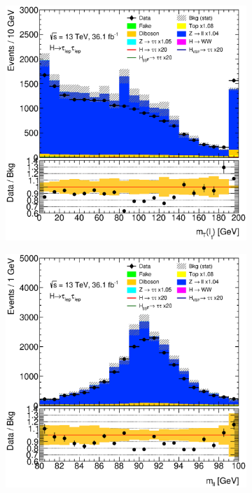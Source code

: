 \begin{figure}[htb]
\begin{subfigure}[t]{0.3\textwidth}
    \end{subfigure}
    \begin{subfigure}[t]{0.3\textwidth}
        \includegraphics[width=\textwidth]{./plots/mva/modeling/input_vars/BOOST_CR/ll-CutMVABoostedCatZllCR-MtLep0-lin.eps}
    \end{subfigure}
    \begin{subfigure}[t]{0.3\textwidth}
        \includegraphics[width=\textwidth]{./plots/mva/modeling/input_vars/BOOST_CR/ll-CutMVABoostedCatZllCR-mvis2-lin.eps}

\end{subfigure}
\end{figure}
